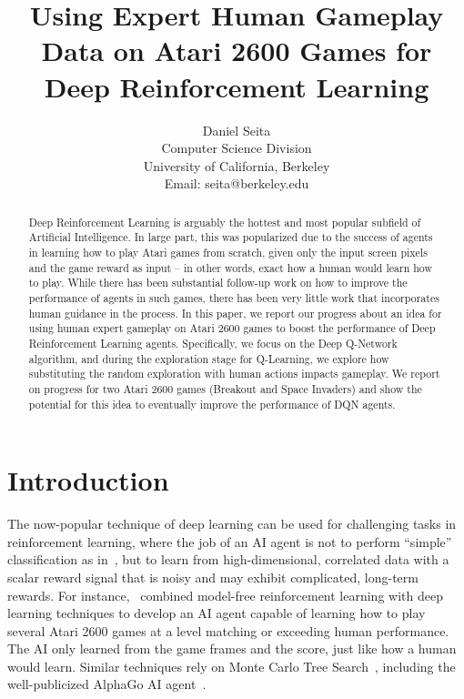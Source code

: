 \documentclass[letterpaper, 10pt, conference]{ieeeconf}
\title{\LARGE \bf Using Expert Human Gameplay Data on Atari 2600 Games for Deep
Reinforcement Learning}
\author{Daniel Seita \\
Computer Science Division\\
University of California, Berkeley\\
Email: seita@berkeley.edu
}
\begin{document}
\maketitle

\begin{abstract}
Deep Reinforcement Learning is arguably the hottest and most popular subfield of
Artificial Intelligence. In large part, this was popularized due to the success
of agents in learning how to play Atari games from scratch, given only the input
screen pixels and the game reward as input -- in other words, exact how a human
would learn how to play. While there has been substantial follow-up work on how
to improve the performance of agents in such games, there has been very little
work that incorporates human guidance in the process. In this paper, we report
our progress about an idea for using human expert gameplay on Atari 2600 games
to boost the performance of Deep Reinforcement Learning agents. Specifically, we
focus on the Deep Q-Network algorithm, and during the exploration stage for
Q-Learning, we explore how substituting the random exploration with human
actions impacts gameplay. We report on progress for two Atari 2600 games
(Breakout and Space Invaders) and show the potential for this idea to eventually
improve the performance of DQN agents.
\end{abstract}

\section{Introduction}\label{sec:introduction}

The now-popular technique of deep learning can be used for challenging tasks in
reinforcement learning, where the job of an AI agent is not to perform
``simple'' classification as in~\cite{AlexNet2012}, but to learn from
high-dimensional, correlated data with a scalar reward signal that is noisy and
may exhibit complicated, long-term rewards. For instance,~\cite{mnih-dqn-2015}
combined model-free reinforcement learning with deep learning techniques to
develop an AI agent capable of learning how to play several Atari 2600 games at
a level matching or exceeding human performance. The AI only learned from the
game frames and the score, just like how a human would learn. Similar techniques
rely on Monte Carlo Tree Search~\cite{nips-atari-2014}, including the
well-publicized AlphaGo AI agent~\cite{silver-alphago-2016}.
\end{document}
